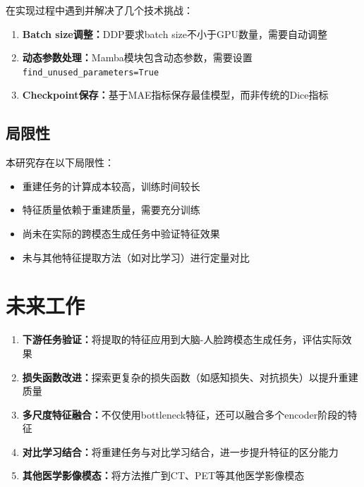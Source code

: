 \documentclass[11pt,a4paper]{article}
\begin{document}
在实现过程中遇到并解决了几个技术挑战：

\begin{enumerate}
    \item \textbf{Batch size调整：}DDP要求batch size不小于GPU数量，需要自动调整

    \item \textbf{动态参数处理：}Mamba模块包含动态参数，需要设置\texttt{find\_unused\_parameters=True}

    \item \textbf{Checkpoint保存：}基于MAE指标保存最佳模型，而非传统的Dice指标
\end{enumerate}

\subsection{局限性}

本研究存在以下局限性：

\begin{itemize}
    \item 重建任务的计算成本较高，训练时间较长
    \item 特征质量依赖于重建质量，需要充分训练
    \item 尚未在实际的跨模态生成任务中验证特征效果
    \item 未与其他特征提取方法（如对比学习）进行定量对比
\end{itemize}

\section{未来工作}

\begin{enumerate}
    \item \textbf{下游任务验证：}将提取的特征应用到大脑-人脸跨模态生成任务，评估实际效果

    \item \textbf{损失函数改进：}探索更复杂的损失函数（如感知损失、对抗损失）以提升重建质量

    \item \textbf{多尺度特征融合：}不仅使用bottleneck特征，还可以融合多个encoder阶段的特征

    \item \textbf{对比学习结合：}将重建任务与对比学习结合，进一步提升特征的区分能力

    \item \textbf{其他医学影像模态：}将方法推广到CT、PET等其他医学影像模态
\end{enumerate}
\end{document}
